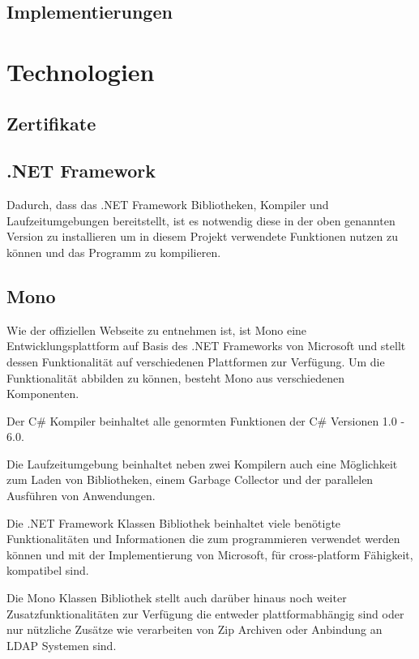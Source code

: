     \subsection{Implementierungen}

\section{Technologien}
    \subsection{Zertifikate} %
    
    \subsection{.NET Framework}
    Dadurch, dass das .NET Framework Bibliotheken, Kompiler und Laufzeitumgebungen bereitstellt, ist es notwendig diese in der oben genannten Version zu installieren um in diesem Projekt verwendete Funktionen nutzen zu können und das Programm zu kompilieren.
    
    \subsection{Mono}
    Wie der offiziellen Webseite \cite{mono_project_2018} zu entnehmen ist, ist Mono eine Entwicklungsplattform auf Basis des .NET Frameworks von Microsoft und stellt dessen Funktionalität auf verschiedenen Plattformen zur Verfügung. Um die Funktionalität abbilden zu können, besteht Mono aus verschiedenen Komponenten.
    
    Der C\# Kompiler beinhaltet alle genormten Funktionen der C\# Versionen 1.0 - 6.0.
    
    Die Laufzeitumgebung beinhaltet neben zwei Kompilern auch eine Möglichkeit zum Laden von Bibliotheken, einem Garbage Collector und der parallelen Ausführen von Anwendungen.

    Die .NET Framework Klassen Bibliothek beinhaltet viele benötigte Funktionalitäten und Informationen die zum programmieren verwendet werden können und mit der Implementierung von Microsoft, für cross-platform Fähigkeit, kompatibel sind.

    Die Mono Klassen Bibliothek stellt auch darüber hinaus noch weiter Zusatzfunktionalitäten zur Verfügung die entweder plattformabhängig sind oder nur nützliche Zusätze wie verarbeiten von Zip Archiven oder Anbindung an LDAP Systemen sind.

